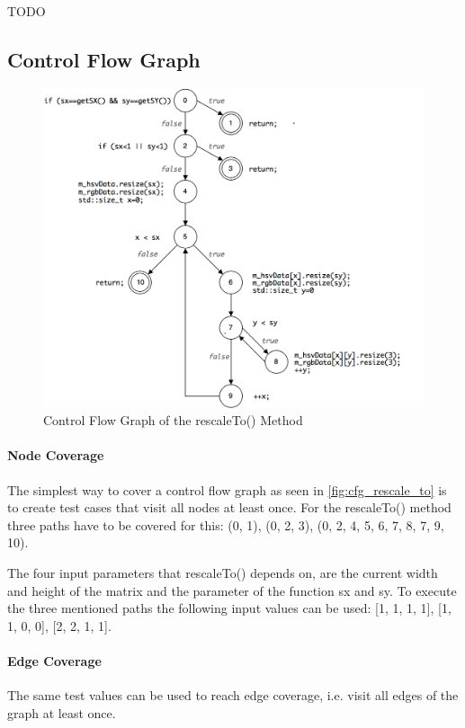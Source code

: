 \documentclass{scrreprt}
\begin{document}
TODO


\subsection{Control Flow Graph}

\begin{figure}[h]
	\centering
	\includegraphics[width=1.0\textwidth]{img/cfg_rescale_to}
	\caption[Control Flow Graph rescaleTo()]{Control Flow Graph of the rescaleTo() Method}
	\label{fig:cfg_rescale_to}
\end{figure}

\paragraph{Node Coverage} The simplest way to cover a control flow graph as seen in \vref{fig:cfg_rescale_to} is to create test cases that visit all nodes at least once. For the rescaleTo() method three paths have to be covered for this: (0, 1), (0, 2, 3), (0, 2, 4, 5, 6, 7, 8, 7, 9, 10).

The four input parameters that rescaleTo() depends on, are the current width and height of the matrix and the parameter of the function sx and sy. To execute the three mentioned paths the following input values can be used: [1, 1, 1, 1], [1, 1, 0, 0], [2, 2, 1, 1].

\paragraph{Edge Coverage} The same test values can be used to reach edge coverage, i.e. visit all edges of the graph at least once.
\end{document}
